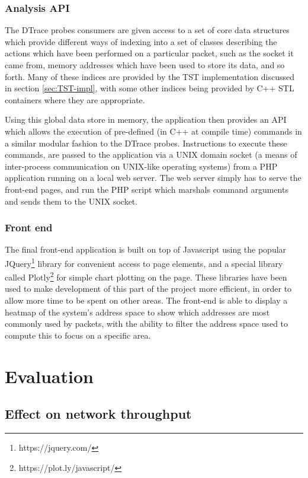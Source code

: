 \documentclass[a4paper,12pt,twoside,openright]{report}
\begin{document}
	\subsection{Analysis API}
	
	The DTrace probes consumers are given access to a set of core data structures which provide different ways of indexing into a set of classes describing the actions which have been performed on a particular packet, such as the socket it came from, memory addresses which have been used to store its data, and so forth. Many of these indices are provided by the TST implementation discussed in section \ref{sec:TST-impl}, with some other indices being provided by C++ STL containers where they are appropriate.
	
	Using this global data store in memory, the application then provides an API which allows the execution of pre-defined (in C++ at compile time) commands in a similar modular fashion to the DTrace probes. Instructions to execute these commands, are passed to the application via a UNIX domain socket (a means of inter-process communication on UNIX-like operating systems) from a PHP application running on a local web server. The web server simply has to serve the front-end pages, and run the PHP script which marshals command arguments and sends them to the UNIX socket.
	
	\subsection{Front end}
	
	The final front-end application is built on top of Javascript using the popular JQuery\footnote{https://jquery.com/} library for convenient access to page elements, and a special library called Plotly\footnote{https://plot.ly/javascript/} for simple chart plotting on the page. These libraries have been used to make development of this part of the project more efficient, in order to allow more time to be spent on other areas. The front-end is able to display a heatmap of the system's address space to show which addresses are most commonly used by packets, with the ability to filter the address space used to compute this to focus on a specific area.
	
	
	\chapter{Evaluation}
	
	\section{Effect on network throughput}
	\label{sec:IPC-expt}
	
\end{document}
